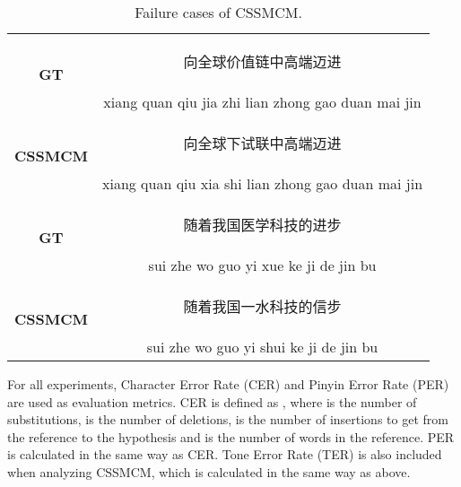 \documentclass[sigconf]{acmart}
\begin{document}
\begin{table}[htp]
\small
\centering
\caption {Failure cases of CSSMCM.}
\label{table:text_failure}
\begin{tabular}{c | c }

\hline
\multirow{2}{*}{\textbf{GT}}     & \begin{CJK*}{UTF8}{gbsn}向全球价值链中高端迈进\end{CJK*} \\
                & xiang quan qiu jia zhi lian zhong gao duan mai jin    \\ \hline
\multirow{2}{*}{\textbf{CSSMCM}} & \begin{CJK*}{UTF8}{gbsn}向全球下试联中高端迈进\end{CJK*} \\
                & xiang quan qiu xia shi lian zhong gao duan mai jin   \\ \hline \hline
  
\multirow{2}{*}{\textbf{GT}}     & \begin{CJK*}{UTF8}{gbsn}随着我国医学科技的进步\end{CJK*}  \\
                & sui zhe wo guo yi xue ke ji de jin bu   \\ 
                \hline
\multirow{2}{*}{\textbf{CSSMCM}} & \begin{CJK*}{UTF8}{gbsn}随着我国一水科技的信步\end{CJK*}  \\
                & sui zhe wo guo yi shui ke ji de jin bu   \\ 
\hline

\end{tabular}
\end{table}

For all experiments, Character Error Rate (CER) and Pinyin Error Rate (PER) are used as evaluation metrics. CER is defined as , where  is the number of substitutions,  is the number of deletions,  is the number of insertions to get from the reference to the hypothesis and  is the number of words in the reference. PER is calculated in the same way as CER. Tone Error Rate (TER) is also included when analyzing CSSMCM, which is calculated in the same way as above.
\end{document}
